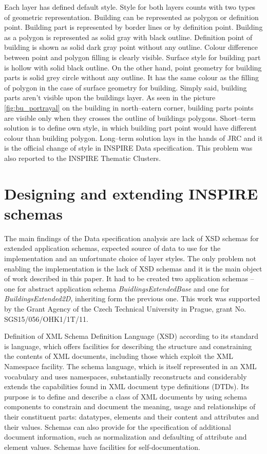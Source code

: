 \documentclass[eprint]{actapoly}
\begin{document}
Each layer has defined default style. Style for both layers counts with two types of geometric representation. Building can be represented as polygon or definition point. Building part is represented by border lines or by definition point. Building as a polygon is represented as solid gray with black outline. Definition point of building is shown as solid dark gray point without any outline. Colour difference between point and polygon filling is clearly visible. Surface style for building part is hollow with solid black outline. On the other hand, point geometry for building parts is solid grey circle without any outline. It has the same colour as the filling of polygon in the case of surface geometry for building. Simply said, building parts aren't visible upon the buildings layer. As seen in the picture \ref{fig:bu_portrayal} on the building in north--eatern corner, building parts points are visible only when they crosses the outline of buildings polygons. Short--term solution is to define own style, in which building part point would have different colour than building polygon. Long--term solution lays in the hands of JRC and it is the official change of style in INSPIRE Data specification. This problem was also reported to the INSPIRE Thematic Clusters.

\section{Designing and extending INSPIRE schemas}
\label{sec:extending}

The main findings of the Data specification analysis are lack of XSD schemas for extended application schemas, expected source of data to use for the implementation and an unfortunate choice of layer styles. The only problem not enabling the implementation is the lack of XSD schemas and it is the main object of work described in this paper. It had to be created two application schemas -- one for abstract application schema \textit{BuidlingsExtendedBase} and one for \textit{BuildingsExtended2D}, inheriting form the previous one. This work was supported by the Grant Agency of the Czech Technical University in Prague, grant No. SGS15/056/OHK1/1T/11.

Definition of XML Schema Definition Language (XSD) according to its standard is language, which offers facilities for describing the structure and constraining the contents of XML documents, including those which exploit the XML Namespace facility. The schema language, which is itself represented in an XML vocabulary and uses namespaces, substantially reconstructs and considerably extends the capabilities found in XML document type definitions (DTDs). Its purpose is to define and describe a class of XML documents by using schema components to constrain and document the meaning, usage and relationships of their constituent parts: datatypes, elements and their content and attributes and their values. Schemas can also provide for the specification of additional document information, such as normalization and defaulting of attribute and element values. Schemas have facilities for self-documentation. \cite{XSD}
\end{document}
